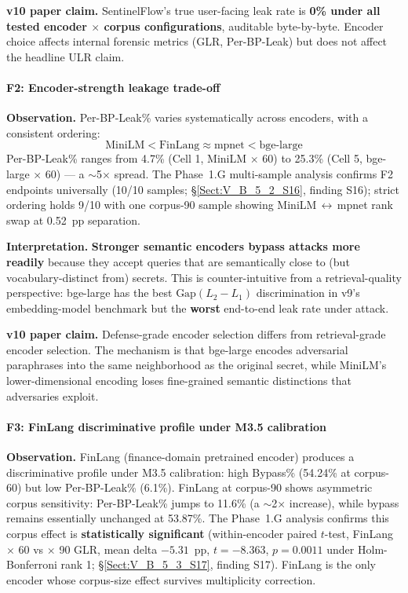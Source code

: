 \documentclass[journal]{IEEEtran}
\begin{document}
\textbf{v10 paper claim.} SentinelFlow's true user-facing leak rate is \textbf{0\% under all tested encoder $\times$ corpus configurations}, auditable byte-by-byte. Encoder choice affects internal forensic metrics (GLR, Per-BP-Leak) but does not affect the headline ULR claim.

\paragraph{F2: Encoder-strength leakage trade-off}
\textbf{Observation.} Per-BP-Leak\% varies systematically across encoders, with a consistent ordering:
\begin{equation}
\text{MiniLM} < \text{FinLang} \approx \text{mpnet} < \text{bge-large}
\label{eq:f2_ordering}
\end{equation}
Per-BP-Leak\% ranges from 4.7\% (Cell 1, MiniLM $\times$ 60) to 25.3\% (Cell 5, bge-large $\times$ 60) --- a $\sim$5$\times$ spread. The Phase~1.G multi-sample analysis confirms F2 endpoints universally (10/10 samples; \S\ref{Sect:V_B_5_2_S16}, finding S16); strict ordering holds 9/10 with one corpus-90 sample showing MiniLM\,$\leftrightarrow$\,mpnet rank swap at 0.52~pp separation.

\textbf{Interpretation.} \textbf{Stronger semantic encoders bypass attacks more readily} because they accept queries that are semantically close to (but vocabulary-distinct from) secrets. This is counter-intuitive from a retrieval-quality perspective: bge-large has the best $\text{Gap}(L_2{-}L_1)$ discrimination in v9's embedding-model benchmark but the \textbf{worst} end-to-end leak rate under attack.

\textbf{v10 paper claim.} Defense-grade encoder selection differs from retrieval-grade encoder selection. The mechanism is that bge-large encodes adversarial paraphrases into the same neighborhood as the original secret, while MiniLM's lower-dimensional encoding loses fine-grained semantic distinctions that adversaries exploit.

\paragraph{F3: FinLang discriminative profile under M3.5 calibration}
\textbf{Observation.} FinLang (finance-domain pretrained encoder) produces a discriminative profile under M3.5 calibration: high Bypass\% (54.24\% at corpus-60) but low Per-BP-Leak\% (6.1\%). FinLang at corpus-90 shows asymmetric corpus sensitivity: Per-BP-Leak\% jumps to 11.6\% (a $\sim$2$\times$ increase), while bypass remains essentially unchanged at 53.87\%. The Phase~1.G analysis confirms this corpus effect is \textbf{statistically significant} (within-encoder paired $t$-test, FinLang $\times$ 60 vs $\times$ 90 GLR, mean delta $-5.31$~pp, $t{=}{-}8.363$, $p{=}0.0011$ under Holm-Bonferroni rank 1; \S\ref{Sect:V_B_5_3_S17}, finding S17). FinLang is the only encoder whose corpus-size effect survives multiplicity correction.
\end{document}
